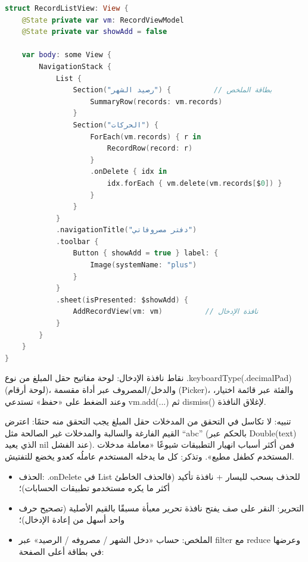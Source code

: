 
\begin{lstlisting}[language=Swift]
struct RecordListView: View {
    @State private var vm: RecordViewModel
    @State private var showAdd = false

    var body: some View {
        NavigationStack {
            List {
                Section("رصيد الشهر") {          // بطاقة الملخص
                    SummaryRow(records: vm.records)
                }
                Section("الحركات") {
                    ForEach(vm.records) { r in
                        RecordRow(record: r)
                    }
                    .onDelete { idx in
                        idx.forEach { vm.delete(vm.records[$0]) }
                    }
                }
            }
            .navigationTitle("دفتر مصروفاتي")
            .toolbar {
                Button { showAdd = true } label: {
                    Image(systemName: "plus")
                }
            }
            .sheet(isPresented: $showAdd) {
                AddRecordView(vm: vm)          // نافذة الإدخال
            }
        }
    }
}
\end{lstlisting}

نقاط نافذة الإدخال: لوحة مفاتيح حقل المبلغ من نوع .keyboardType(.decimalPad) (لوحة أرقام)، والدخل/المصروف عبر أداة مقسمة (Picker)، والفئة عبر قائمة اختيار، وعند الضغط على «حفظ» تستدعي vm.add(...) ثم dismiss() لإغلاق النافذة.

\begin{tcbwarn}{تنبيه: لا تكاسل في التحقق من المدخلات}
حقل المبلغ يجب التحقق منه حتمًا: اعترض القيم الفارغة والسالبة والمدخلات غير الصالحة مثل “abc” (بالحكم عبر Double(text) الذي يعيد nil عند الفشل). فمن أكثر أسباب انهيار التطبيقات شيوعًا «معاملة مدخلات المستخدم كطفل مطيع». وتذكر: كل ما يدخله المستخدم عاملُه كعدو يخضع للتفتيش.

\end{tcbwarn}


\begin{itemize}
  \item الحذف: .onDelete في List للحذف بسحب لليسار + نافذة تأكيد (فالحذف الخاطئ أكثر ما يكره مستخدمو تطبيقات الحسابات)؛
  \item التحرير: النقر على صف يفتح نافذة تحرير معبأة مسبقًا بالقيم الأصلية (تصحيح حرف واحد أسهل من إعادة الإدخال)؛
  \item الملخص: حساب «دخل الشهر / مصروفه / الرصيد» عبر filter مع reduce وعرضها في بطاقة أعلى الصفحة:
\end{itemize}

